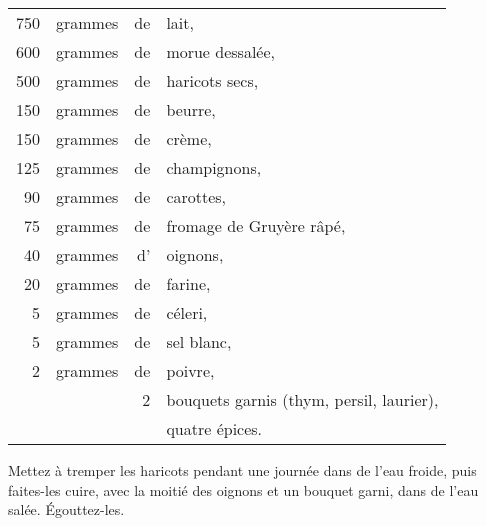 \footnotesize
\begin{longtable}{rrrp{16em}}
    750 & grammes & de & lait,                                                                            \\
    600 & grammes & de & morue dessalée,                                                                  \\
    500 & grammes & de & haricots secs,                                                                   \\
    150 & grammes & de & beurre,                                                                          \\
    150 & grammes & de & crème,                                                                           \\
    125 & grammes & de & champignons,                                                                     \\
     90 & grammes & de & carottes,                                                                        \\
     75 & grammes & de & fromage de Gruyère râpé,                                                         \\
     40 & grammes & d' & oignons,                                                                         \\
     20 & grammes & de & farine,                                                                          \\
      5 & grammes & de & céleri,                                                                          \\
      5 & grammes & de & sel blanc,                                                                       \\
      2 & grammes & de & poivre,                                                                          \\
        &         &  2 & bouquets garnis (thym, persil, laurier),                                         \\
        &         &    & quatre épices.                                                                   \\
\end{longtable}
\normalsize

Mettez à tremper les haricots pendant une journée dans de l'eau froide, puis
faites-les cuire, avec la moitié des oignons et un bouquet garni, dans de l'eau
salée. Égouttez-les.

